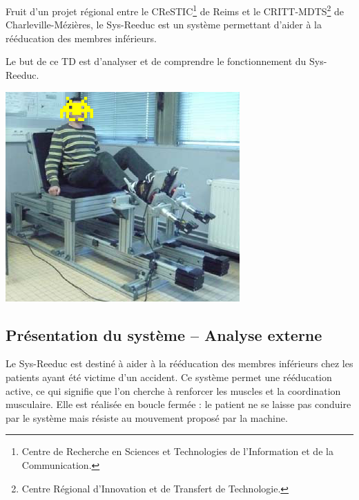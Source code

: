 \documentclass[10pt]{article}
\begin{document}
\begin{minipage}[c]{.7\linewidth}
Fruit d'un projet régional entre le CReSTIC\footnote{Centre de Recherche en Sciences et Technologies de l'Information et de la Communication.} de Reims et le CRITT-MDTS\footnote{Centre Régional d'Innovation et de Transfert de Technologie.} de Charleville-Mézières, le Sys-Reeduc est un système permettant d'aider à la rééducation des membres inférieurs. 
\begin{obj} 
Le but de ce TD est d'analyser et de comprendre le fonctionnement du Sys-Reeduc.
\end{obj}

\end{minipage} \hfill
\begin{minipage}[c]{.27\linewidth}
\begin{center}
\includegraphics[width=\textwidth]{images/Sys_Reeduc_01}
\end{center}
\end{minipage}

\subsection*{Présentation du système -- Analyse externe}

\ifprof
\else
Le Sys-Reeduc est destiné à aider à la rééducation des membres inférieurs chez les patients ayant été victime d'un accident. Ce système permet une rééducation active, ce qui signifie que l'on cherche à renforcer les muscles et la coordination musculaire. Elle est réalisée en boucle fermée : le patient ne se laisse pas conduire par le système mais résiste au mouvement proposé par la machine.
\end{document}
